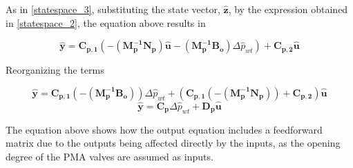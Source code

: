 As in \eqref{statespace_3}, substituting the state vector, $\bm{\hat{z}}$, by the expression obtained in \eqref{statespace_2}, the equation above results in 

\begin{equation}
\bm{\hat{y}} = \bm{C_{p,1}} (-(\bm{M_p^{-1}}\bm{N_p})\bm{\hat{u}} - (\bm{M_p^{-1}}\bm{B_o})\Delta \hat{p}_{wt})  + \bm{C_{p,2}}\bm{\hat{u}}  
 \label{statespace_6}
\end{equation}

Reorganizing the terms

\begin{equation}
\bm{\hat{y}} = \bm{C_{p,1}} (-(\bm{M_p^{-1}}\bm{B_o})) \Delta \hat{p}_{wt} + (\bm{C_{p,1}} (-(\bm{M_p^{-1}}\bm{N_p})) + \bm{C_{p,2}}) \bm{\hat{u}}  
 \label{finaloutput}
\end{equation}
%
\begin{equation}
  \bm{\hat{y}} = \bm{C_{p}} \Delta \hat{p}_{wt} + \bm{D_p} \bm{\hat{u}} 
  \label{outputfinaleq}
\end{equation}

The equation above shows how the output equation includes a feedforward matrix due to the outputs being affected directly by the inputs, as the opening degree of the PMA valves are assumed as inputs.

